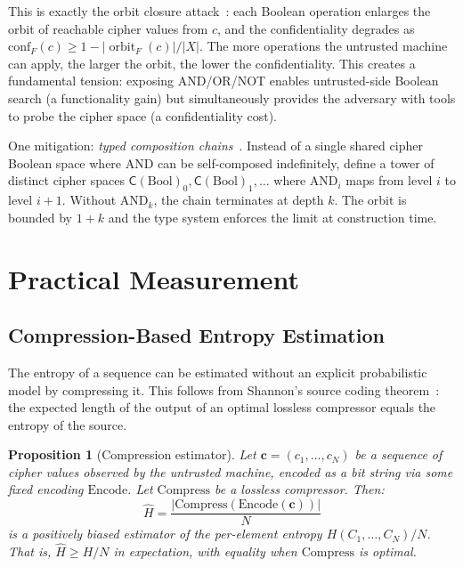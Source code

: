 \documentclass[11pt]{article}
\theoremstyle{definition}
\theoremstyle{plain}
\newtheorem{proposition}[theorem]{Proposition}
\theoremstyle{remark}
\newcommand{\cipher}[1]{\mathsf{C}(#1)}
\DeclareMathOperator{\orbitF}{orbit}
\begin{document}
This is exactly the orbit closure
attack~\cite[Sec.~5]{towell2026algebraic}: each Boolean operation
enlarges the orbit of reachable cipher values from $c$, and the
confidentiality degrades as
$\mathrm{conf}_F(c) \geq 1 - |\orbitF_F(c)|/|X|$.
The more operations the untrusted machine can apply, the larger the
orbit, the lower the confidentiality.
This creates a fundamental tension: exposing AND/OR/NOT enables
untrusted-side Boolean search (a functionality gain) but simultaneously
provides the adversary with tools to probe the cipher space
(a confidentiality cost).

One mitigation: \emph{typed composition chains}~\cite[Sec.~5.5]{towell2026algebraic}.
Instead of a single shared cipher Boolean space where AND can be
self-composed indefinitely, define a tower of distinct cipher spaces
$\cipher{\mathrm{Bool}}_0, \cipher{\mathrm{Bool}}_1, \ldots$
where $\mathrm{AND}_i$ maps from level $i$ to level $i+1$.
Without $\mathrm{AND}_{k}$, the chain terminates at depth $k$.
The orbit is bounded by $1 + k$ and the type system enforces the
limit at construction time.

\section{Practical Measurement}
\label{sec:measurement}

\subsection{Compression-Based Entropy Estimation}

The entropy of a sequence can be estimated without an explicit
probabilistic model by compressing it.  This follows from Shannon's
source coding theorem~\cite{shannon1948mathematical}: the expected length
of the output of an optimal lossless compressor equals the entropy of the
source.

\begin{proposition}[Compression estimator]
\label{prop:compression}
Let $\mathbf{c} = (c_1, \ldots, c_N)$ be a sequence of cipher values
observed by the untrusted machine, encoded as a bit string via some
fixed encoding $\mathrm{Encode}$.  Let $\mathrm{Compress}$ be a lossless
compressor.  Then:
\begin{equation}
\hat{H} = \frac{|\mathrm{Compress}(\mathrm{Encode}(\mathbf{c}))|}{N}
\end{equation}
is a positively biased estimator of the per-element entropy
$H(C_1, \ldots, C_N) / N$.  That is, $\hat{H} \geq H/N$ in expectation,
with equality when $\mathrm{Compress}$ is optimal.
\end{proposition}
\end{document}
